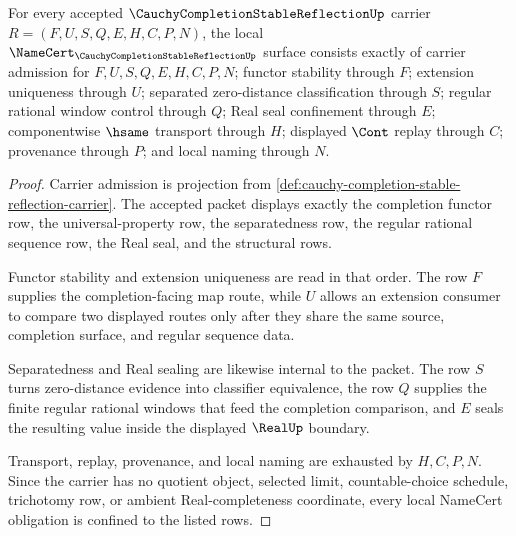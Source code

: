 \begin{theorem}
\label{thm:cauchy-completion-stable-reflection-namecert-obligations}
For every accepted $\CauchyCompletionStableReflectionUp$ carrier $R=(F,U,S,Q,E,H,C,P,N)$, the local $\NameCert_{\CauchyCompletionStableReflectionUp}$ surface consists exactly of carrier admission for $F,U,S,Q,E,H,C,P,N$; functor stability through $F$; extension uniqueness through $U$; separated zero-distance classification through $S$; regular rational window control through $Q$; Real seal confinement through $E$; componentwise $\hsame$ transport through $H$; displayed $\Cont$ replay through $C$; provenance through $P$; and local naming through $N$.
\end{theorem}
\begin{proof}
Carrier admission is projection from \autoref{def:cauchy-completion-stable-reflection-carrier}. The accepted packet displays exactly the completion functor row, the universal-property row, the separatedness row, the regular rational sequence row, the Real seal, and the structural rows.

Functor stability and extension uniqueness are read in that order. The row $F$ supplies the completion-facing map route, while $U$ allows an extension consumer to compare two displayed routes only after they share the same source, completion surface, and regular sequence data.

Separatedness and Real sealing are likewise internal to the packet. The row $S$ turns zero-distance evidence into classifier equivalence, the row $Q$ supplies the finite regular rational windows that feed the completion comparison, and $E$ seals the resulting value inside the displayed $\RealUp$ boundary.

Transport, replay, provenance, and local naming are exhausted by $H,C,P,N$. Since the carrier has no quotient object, selected limit, countable-choice schedule, trichotomy row, or ambient Real-completeness coordinate, every local NameCert obligation is confined to the listed rows.
\end{proof}

